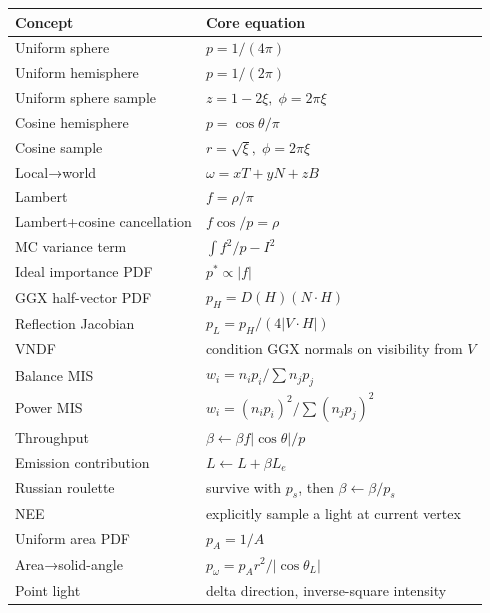 {\def\LTcaptype{none} %
\begin{longtable}[]{@{}
  >{\raggedright\arraybackslash}p{}
  >{\raggedright\arraybackslash}p{}@{}}
\toprule\noalign{}
\begin{minipage}[b]{\linewidth}\raggedright
Concept
\end{minipage} & \begin{minipage}[b]{\linewidth}\raggedright
Core equation
\end{minipage} \\
\midrule\noalign{}
\endhead
\bottomrule\noalign{}
\endlastfoot
Uniform sphere & \(p=1/(4\pi)\) \\
Uniform hemisphere & \(p=1/(2\pi)\) \\
Uniform sphere sample & \(z=1-2\xi,\;\phi=2\pi\xi\) \\
Cosine hemisphere & \(p=\cos\theta/\pi\) \\
Cosine sample & \(r=\sqrt{\xi},\;\phi=2\pi\xi\) \\
Local→world & \(\omega=xT+yN+zB\) \\
Lambert & \(f=\rho/\pi\) \\
Lambert+cosine cancellation & \(f\cos/p=\rho\) \\
MC variance term & \(\int f^2/p-I^2\) \\
Ideal importance PDF & \(p^*\propto|f|\) \\
GGX half-vector PDF & \(p_H=D(H)(N\cdot H)\) \\
Reflection Jacobian & \(p_L=p_H/(4|V\cdot H|)\) \\
VNDF & condition GGX normals on visibility from \(V\) \\
Balance MIS & \(w_i=n_ip_i/\sum n_jp_j\) \\
Power MIS & \(w_i=(n_ip_i)^2/\sum(n_jp_j)^2\) \\
Throughput & \(\beta\leftarrow\beta f|\cos\theta|/p\) \\
Emission contribution & \(L\leftarrow L+\beta L_e\) \\
Russian roulette & survive with \(p_s\), then \(\beta\leftarrow\beta/p_s\) \\
NEE & explicitly sample a light at current vertex \\
Uniform area PDF & \(p_A=1/A\) \\
Area→solid-angle & \(p_\omega=p_A r^2/|\cos\theta_L|\) \\
Point light & delta direction, inverse-square intensity \\

\end{longtable}}
